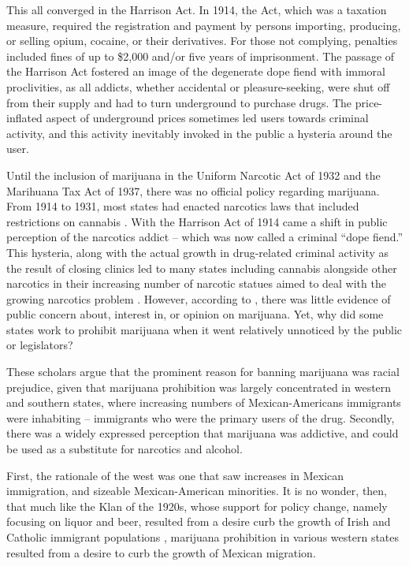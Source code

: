 This all converged in the Harrison Act. In 1914, the Act, which was a taxation measure, required the registration and payment by persons importing, producing, or selling opium, cocaine, or their derivatives. For those not complying, penalties included fines of up to \$2,000 and/or five years of imprisonment. The passage of the Harrison Act fostered an image of the degenerate dope fiend with immoral proclivities, as all addicts, whether accidental or pleasure-seeking, were shut off from their supply and had to turn underground to purchase drugs. The price-inflated aspect of underground prices sometimes led users towards criminal activity, and this activity inevitably invoked in the public a hysteria around the user.


Until the inclusion of marijuana in the Uniform Narcotic Act of 1932 and the Marihuana Tax Act of 1937, there was no official policy regarding marijuana. From 1914 to 1931, most states had enacted narcotics laws that included restrictions on cannabis \citep{bonnie_and_whitebread_1970}. With the Harrison Act of 1914 came a shift in public perception of the narcotics addict -- which was now called a criminal ``dope fiend.'' This hysteria, along with the actual growth in drug-related criminal activity as the result of closing clinics led to many states including cannabis alongside other narcotics in their increasing number of narcotic statues aimed to deal with the growing narcotics problem \citep{terry_and_pellens_1928}. However, according to \citet{bonnie_and_whitebread_1970}, there was little evidence of public concern about, interest in, or opinion on marijuana. Yet, why did some states work to prohibit marijuana when it went relatively unnoticed by the public or legislators?

These scholars argue that the prominent reason for banning marijuana was racial prejudice, given that marijuana prohibition was largely concentrated in western and southern states, where increasing numbers of Mexican-Americans immigrants were inhabiting -- immigrants who were the primary users of the drug. Secondly, there was a widely expressed perception that marijuana was addictive, and could be used as a substitute for narcotics and alcohol. 


First, the rationale of the west was one that saw increases in Mexican immigration, and sizeable Mexican-American minorities. It is no wonder, then, that much like the Klan of the 1920s, whose support for policy change, namely focusing on liquor and beer, resulted from a desire curb the growth of Irish and Catholic immigrant populations \citep{mcveigh_2009,andrews_and_seguin_2015}, marijuana prohibition in various western states resulted from a desire to curb the growth of Mexican migration. 

